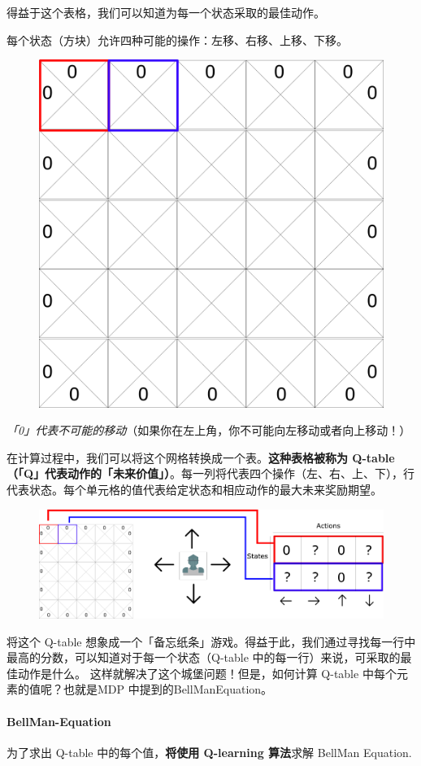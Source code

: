 \documentclass[UTF8,a4paper,12pt]{ctexbook}
\begin{document}
					得益于这个表格，我们可以知道为每一个状态采取的最佳动作。
					
					每个状态（方块）允许四种可能的操作：左移、右移、上移、下移。
					\begin{figure}[H]
						\centering
						\includegraphics[width=.5\linewidth]{policy02}
					\end{figure}					
					
					
					\textit{「0」代表不可能的移动}（如果你在左上角，你不可能向左移动或者向上移动！）
					
					在计算过程中，我们可以将这个网格转换成一个表。\textbf{这种表格被称为 Q-table（「Q」代表动作的「未来价值」）}。每一列将代表四个操作（左、右、上、下），行代表状态。每个单元格的值代表给定状态和相应动作的最大未来奖励期望。
					\begin{figure}[H]
						\centering
						\includegraphics[width=.9\linewidth]{policy02_1}
					\end{figure}
					
					将这个 Q-table 想象成一个「备忘纸条」游戏。得益于此，我们通过寻找每一行中最高的分数，可以知道对于每一个状态（Q-table 中的每一行）来说，可采取的最佳动作是什么。
					这样就解决了这个城堡问题！但是，如何计算 Q-table 中每个元素的值呢？也就是MDP 中提到的BellManEquation。
										
			\paragraph{BellMan-Equation}
				为了求出 Q-table 中的每个值，\textbf{将使用 Q-learning 算法}求解 BellMan Equation. 
				
\end{document}
